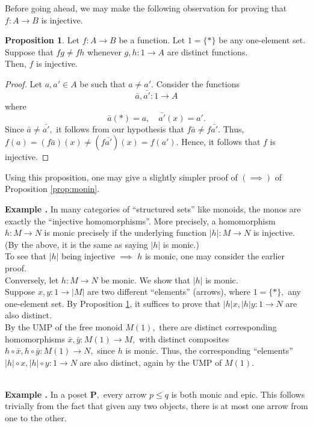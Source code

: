 \documentclass[11pt,leqno,landscape,semhelv]{seminar}
\numberwithin{equation}{section}
\theoremstyle{definition}
\newtheorem{prop}[thm]{Proposition}
\numberwithin{thm}{section}
\numberwithin{equation}{section}
\newcommand{\example}[1]{\refstepcounter{thm}\par\medskip
   {\textbf{Example \thethm.} #1} \rmfamily}
\begin{document}
Before going ahead, we may make the following observation for proving that $f:A\to B$ is injective.
\begin{prop} \label{prop:injec}
	Let $f:A\to B$ be a function. Let $1 = \{*\}$ be any one-element set.\\
	Suppose that $fg \neq fh$ whenever $g, h: 1 \to A$ are distinct functions.\\
	Then, $f$ is injective.
\end{prop}
\begin{proof} 
	Let $a, a' \in A$ be such that $a \neq a'.$ Consider the functions
	\begin{equation*} 
		\bar{a}, \bar{a'} : 1 \to A
	\end{equation*}
	where
	\begin{equation*} 
		\bar{a}(*) = a, \quad \bar{a'}(x) = a'.
	\end{equation*}
	Since $\bar{a} \neq \bar{a'},$ it follows from our hypothesis that $f\bar{a} \neq f\bar{a'}.$ Thus, $f(a) = (f\bar{a})(x) \neq (f\bar{a'})(x) = f(a').$ Hence, it follows that $f$ is injective.
\end{proof}
Using this proposition, one may give a slightly simpler proof of $(\implies)$ of Proposition \ref{prop:monin}.\\
\example{} In many categories of ``structured sets'' like monoids, the monos are exactly the ``injective homomorphisms''. More precisely, a homomorphism $h:M\to N$ is monic precisely if the underlying function $|h|:M\to N$ is injective. (By the above, it is the same as saying $|h|$ is monic.)\\
To see that $|h|$ being injective $\implies$ $h$ is monic, one may consider the earlier proof.\\
Conversely, let $h:M \to N$ be monic. We show that $|h|$ is monic. \\
Suppose $x, y:1 \to |M|$ are two different ``elements'' (arrows), where $1 = \{*\},$ any one-element set. By Proposition \ref{prop:injec}, it suffices to prove that $|h|x, |h|y : 1 \to N$ are also distinct.\\
By the UMP of the free monoid $M(1),$ there are distinct corresponding homomorphisms $\bar{x}, \bar{y}:M(1) \to M,$ with distinct composites $h\circ \bar{x}, h\circ \bar{y}:M(1) \to N,$ since $h$ is monic. Thus, the corresponding ``elements'' $|h|\circ x, |h|\circ y:1 \to N$ are also distinct, again by the UMP of $M(1).$\\\\
\example{} In a poset $\mathbf{P},$ every arrow $p \le q$ is both monic and epic. This follows trivially from the fact that given any two objects, there is at most one arrow from one to the other.\\\\
\end{document}

